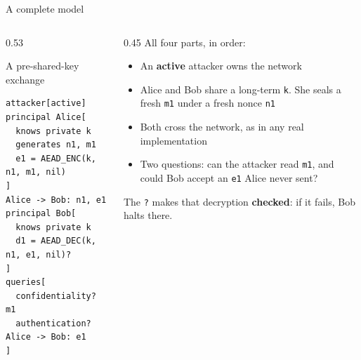 \ifdefined\PRESENTATION\else\PassOptionsToClass{handout}{beamer}\fi\documentclass[aspectratio=169, lualatex]{beamer}
\begin{document}
\begin{frame}[fragile]{A complete model}
	\begin{columns}[t]
		\begin{column}{0.53\textwidth}
			\begin{vpmodel}{A pre-shared-key exchange}
				\begin{lstlisting}
attacker[active]
principal Alice[
  knows private k
  generates n1, m1
  e1 = AEAD_ENC(k, n1, m1, nil)
]
Alice -> Bob: n1, e1
principal Bob[
  knows private k
  d1 = AEAD_DEC(k, n1, e1, nil)?
]
queries[
  confidentiality? m1
  authentication? Alice -> Bob: e1
]
\end{lstlisting}
			\end{vpmodel}
		\end{column}
		\begin{column}{0.45\textwidth}
			\small
			All four parts, in order:
			\vspace{0.2em}
			\begin{itemize}
				\item An \textbf{active} attacker owns the network
				\item Alice and Bob share a long-term \texttt{k}. She seals a fresh \texttt{m1} under a fresh nonce \texttt{n1}
				\item Both cross the network, as in any real implementation
				\item Two questions: can the attacker read \texttt{m1}, and could Bob accept an \texttt{e1} Alice never sent?
			\end{itemize}
			\vspace{0.3em}
			The \texttt{?} makes that decryption \textbf{checked}: if it fails, Bob halts there.
		\end{column}
	\end{columns}
\end{frame}
\end{document}

